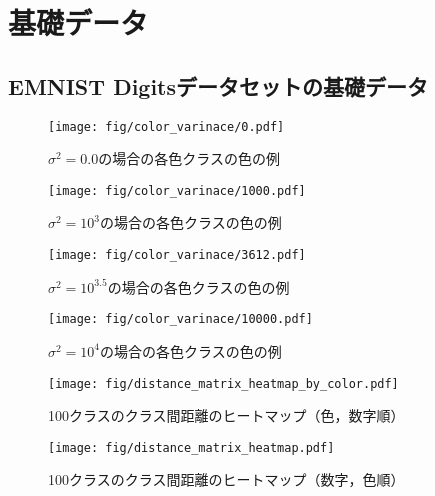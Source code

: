 \chapter{基礎データ}
\label{付録}

\section{EMNIST Digitsデータセットの基礎データ}
\begin{figure}[H]
    \centering
    \texttt{[image: fig/color\_varinace/0.pdf]}
    \caption{$\sigma^2 = 0.0$の場合の各色クラスの色の例}
    \label{fig:variance_0}
\end{figure}

\begin{figure}[H]
    \centering
    \texttt{[image: fig/color\_varinace/1000.pdf]}
    \caption{$\sigma^2 = 10^3$の場合の各色クラスの色の例}
    \label{fig:variance_1000}
\end{figure}

\begin{figure}[H]
    \centering
    \texttt{[image: fig/color\_varinace/3612.pdf]}
    \caption{$\sigma^2 = 10^{3.5}$の場合の各色クラスの色の例}
    \label{fig:variance_3612}
\end{figure}

\begin{figure}[H]
    \centering
    \texttt{[image: fig/color\_varinace/10000.pdf]}
    \caption{$\sigma^2 = 10^4$の場合の各色クラスの色の例}
    \label{fig:variance_10000}
\end{figure}

\begin{figure}[H]
    \centering
    \texttt{[image: fig/distance\_matrix\_heatmap\_by\_color.pdf]}
    \caption{100クラスのクラス間距離のヒートマップ（色，数字順）}
    \label{fig:distance_matrix_heatmap_by_color}
\end{figure}

\begin{figure}[H]
    \centering
    \texttt{[image: fig/distance\_matrix\_heatmap.pdf]}
    \caption{100クラスのクラス間距離のヒートマップ（数字，色順）}
    \label{fig:distance_matrix_heatmap_by_digit}
\end{figure}

